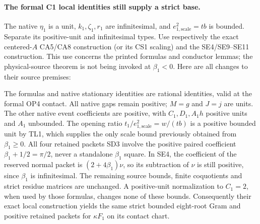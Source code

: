 \paragraph{The formal C1 local identities still supply a strict base.}
The native $\eta_1$ is a unit, $k_1,\zeta_1,r_1$ are infinitesimal,
and $e_{1,\mathrm{scale}}^2=tb$ is bounded. Separate its positive-unit
and infinitesimal types. Use respectively the exact centered-$A$
CA5/CA8 construction (or its CS1 scaling) and the SE4/SE9--SE11
construction. This use concerns the printed formulas and conductor
lemmas; the physical-source theorem is not being invoked at $\beta_1<0$.
Here are all changes to their source premises:

The formulas and native stationary identities are rational identities,
valid at the formal OP4 contact. All native gaps remain positive; $M=g$
and $J=j$ are units. The other native event coefficients are positive,
with $C_1,D_1,A_1h$ positive units and $A_1$ unbounded. The opening
ratio $t_1/e_{1,\mathrm{scale}}^2=w/(tb)$ is a positive bounded unit
by TL1, which supplies the only scale bound previously obtained from
$\beta_1\ge0$. All four retained packets SD3 involve the positive
paired coefficient $\beta_1+1/2=\pi/2$, never a standalone
$\beta_1$ square. In SE4, the coefficient of the reserved normal packet
is $(2+4\beta_1)\nu$, so its subtraction of $\nu$ is still positive,
since $\beta_1$ is infinitesimal. The remaining source bounds, finite
coquotients and strict residue matrices are unchanged. A positive-unit
normalization to $C_1=2$, when used by those formulas, changes none of
these bounds. Consequently their exact local construction yields the
same strict bounded eight-root Gram and positive retained packets for
$\kappa F_1$ on its contact chart.

